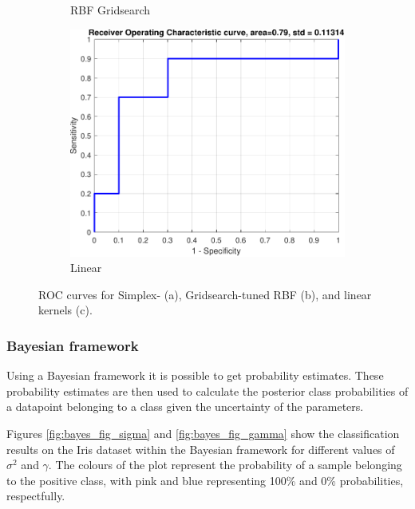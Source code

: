 \documentclass{article}
\begin{document}
\begin{figure}[h]
\begin{subfigure}[b]{0.3\textwidth}
                    \caption{RBF Gridsearch}
                     \label{fig:roc_rbf_gridsearch_tuned}
                 \end{subfigure}
                 \hfill
                 \begin{subfigure}[b]{0.3\textwidth}
                     \centering
                     \includegraphics[width=\textwidth]{Assignment 1/figures/linear_classifier_roc.pdf}
                    \caption{Linear}
                     \label{fig:roc_linear}
                 \end{subfigure}
                \caption{ROC curves for Simplex- (a), Gridsearch-tuned RBF (b), and linear kernels (c). }
                \label{fig:roc_curves_all}
            \end{figure}
            
        
        \subsubsection{Bayesian framework} 
            Using a Bayesian framework it is possible to get probability estimates. These probability estimates are then used to calculate the posterior class probabilities of a datapoint belonging to a class given the uncertainty of the parameters. 
            
            Figures \ref{fig:bayes_fig_sigma} and \ref{fig:bayes_fig_gamma} show the classification results on the Iris dataset within the Bayesian framework for different values of $\sigma^2$ and $\gamma$. The colours of the plot represent the probability of a sample belonging to the positive class, with pink and blue representing 100\% and 0\% probabilities, respectfully. 
            
\end{document}
